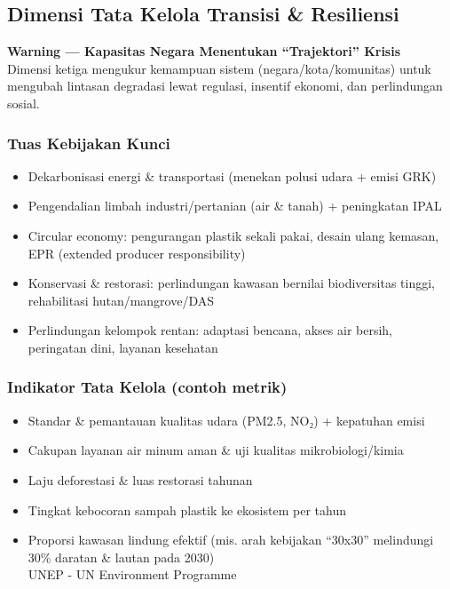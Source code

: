 \documentclass[
  letterpaper,
  DIV=11,
  numbers=noendperiod]{scrreprt}
\providecommand{\tightlist}{%
  \setlength{\itemsep}{0pt}\setlength{\parskip}{0pt}}
\begin{document}
\subsection{Dimensi Tata Kelola Transisi \&
Resiliensi}\label{dimensi-tata-kelola-transisi-resiliensi}

\textbf{Warning --- Kapasitas Negara Menentukan ``Trajektori'' Krisis}\\
Dimensi ketiga mengukur kemampuan sistem (negara/kota/komunitas) untuk
mengubah lintasan degradasi lewat regulasi, insentif ekonomi, dan
perlindungan sosial.

\subsubsection{Tuas Kebijakan Kunci}\label{tuas-kebijakan-kunci}

\begin{itemize}
\tightlist
\item
  Dekarbonisasi energi \& transportasi (menekan polusi udara + emisi
  GRK)
\item
  Pengendalian limbah industri/pertanian (air \& tanah) + peningkatan
  IPAL
\item
  Circular economy: pengurangan plastik sekali pakai, desain ulang
  kemasan, EPR (extended producer responsibility)
\item
  Konservasi \& restorasi: perlindungan kawasan bernilai biodiversitas
  tinggi, rehabilitasi hutan/mangrove/DAS
\item
  Perlindungan kelompok rentan: adaptasi bencana, akses air bersih,
  peringatan dini, layanan kesehatan
\end{itemize}

\subsubsection{Indikator Tata Kelola (contoh
metrik)}\label{indikator-tata-kelola-contoh-metrik}

\begin{itemize}
\tightlist
\item
  Standar \& pemantauan kualitas udara (PM2.5, NO₂) + kepatuhan emisi
\item
  Cakupan layanan air minum aman \& uji kualitas mikrobiologi/kimia
\item
  Laju deforestasi \& luas restorasi tahunan
\item
  Tingkat kebocoran sampah plastik ke ekosistem per tahun
\item
  Proporsi kawasan lindung efektif (mis. arah kebijakan ``30x30''
  melindungi 30\% daratan \& lautan pada 2030)\\
  UNEP - UN Environment Programme
\end{itemize}
\end{document}
